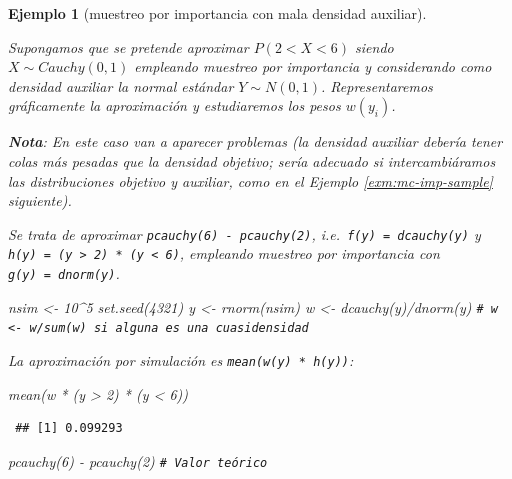 \documentclass[
  10pt,
]{book}
\newenvironment{Shaded}{\begin{snugshade}}{\end{snugshade}}
\newcommand{\CommentTok}[1]{\textcolor[rgb]{0.56,0.35,0.01}{\textit{#1}}}
\newcommand{\DecValTok}[1]{\textcolor[rgb]{0.00,0.00,0.81}{#1}}
\newcommand{\FunctionTok}[1]{\textcolor[rgb]{0.00,0.00,0.00}{#1}}
\newcommand{\NormalTok}[1]{#1}
\newcommand{\OtherTok}[1]{\textcolor[rgb]{0.56,0.35,0.01}{#1}}
\newcommand{\SpecialCharTok}[1]{\textcolor[rgb]{0.00,0.00,0.00}{#1}}
\theoremstyle{break}
\newtheorem{example}{Ejemplo}[chapter]
\theoremstyle{nonumberplain}
\renewcommand{\CommentTok}[1]{\textcolor[rgb]{0.41,0.41,0.41}{\texttt{#1}}}
\begin{document}
\begin{example}[muestreo por importancia con mala densidad auxiliar]
\protect\hypertarget{exm:mc-imp2}{}\label{exm:mc-imp2}

Supongamos que se pretende aproximar \(P\left(2<X<6\right)\) siendo \(X\sim Cauchy(0,1)\) empleando muestreo por importancia y considerando como densidad auxiliar la normal estándar \(Y\sim N(0,1)\). Representaremos gráficamente la aproximación y estudiaremos los pesos \(w(y_i)\).

\textbf{Nota}: En este caso van a aparecer problemas
(la densidad auxiliar debería tener colas más pesadas que la densidad objetivo;
sería adecuado si intercambiáramos las distribuciones objetivo y auxiliar,
como en el Ejemplo \ref{exm:mc-imp-sample} siguiente).

Se trata de aproximar \texttt{pcauchy(6)\ -\ pcauchy(2)},
i.e.~\texttt{f(y)\ =\ dcauchy(y)} y \texttt{h(y)\ =\ (y\ \textgreater{}\ 2)\ *\ (y\ \textless{}\ 6)},
empleando muestreo por importancia con \texttt{g(y)\ =\ dnorm(y)}.

\begin{Shaded}
\begin{Highlighting}[]
\NormalTok{nsim }\OtherTok{\textless{}{-}} \DecValTok{10}\SpecialCharTok{\^{}}\DecValTok{5}
\FunctionTok{set.seed}\NormalTok{(}\DecValTok{4321}\NormalTok{)}
\NormalTok{y }\OtherTok{\textless{}{-}} \FunctionTok{rnorm}\NormalTok{(nsim)}
\NormalTok{w }\OtherTok{\textless{}{-}} \FunctionTok{dcauchy}\NormalTok{(y)}\SpecialCharTok{/}\FunctionTok{dnorm}\NormalTok{(y) }\CommentTok{\# w \textless{}{-} w/sum(w) si alguna es una cuasidensidad}
\end{Highlighting}
\end{Shaded}

La aproximación por simulación es \texttt{mean(w(y)\ *\ h(y))}:

\begin{Shaded}
\begin{Highlighting}[]
\FunctionTok{mean}\NormalTok{(w }\SpecialCharTok{*}\NormalTok{ (y }\SpecialCharTok{\textgreater{}} \DecValTok{2}\NormalTok{) }\SpecialCharTok{*}\NormalTok{ (y }\SpecialCharTok{\textless{}} \DecValTok{6}\NormalTok{)) }
\end{Highlighting}
\end{Shaded}

\begin{verbatim}
 ## [1] 0.099293
\end{verbatim}

\begin{Shaded}
\begin{Highlighting}[]
\FunctionTok{pcauchy}\NormalTok{(}\DecValTok{6}\NormalTok{) }\SpecialCharTok{{-}} \FunctionTok{pcauchy}\NormalTok{(}\DecValTok{2}\NormalTok{)  }\CommentTok{\# Valor teórico}
\end{Highlighting}
\end{Shaded}


\end{example}
\end{document}
